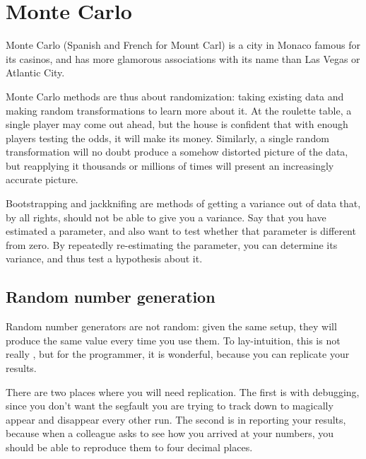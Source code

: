 \startonecol \chapter{Monte Carlo} \label{boot} \endonecol

Monte Carlo (Spanish and French for Mount Carl) is a city in Monaco
famous for its casinos, and has more glamorous associations with its name
than Las Vegas or Atlantic City.

Monte Carlo methods are thus about randomization: taking existing data
and making random transformations to learn more about it. At the
roulette table, a single player may come out ahead, but the house is
confident that with enough players testing the odds, it will make its
money.  Similarly, a single random transformation will no doubt produce a
somehow distorted picture of the data, but reapplying it thousands or
millions of times will present an increasingly accurate picture.

Bootstrapping and jackknifing are methods of getting a variance out of
data that, by all rights, should not be able to give you a variance. Say
that you have estimated a parameter, and also want to test whether
that parameter is different from zero. By repeatedly re-estimating the
parameter, you can determine its variance, and thus test a hypothesis
about it.

\section{Random number generation}\label{randomnumbers}
Random number generators are not random: given the same setup, they
will produce the same value every time you use them. To lay-intuition,
this is not really , but for the programmer, it is wonderful,
because you can replicate your results.

There are two places where you will need replication. The first is with
debugging, since you don't want the segfault you are trying to track
down to magically appear and disappear every other run. The second is
in reporting your results, because when a colleague asks to see how you
arrived at your numbers, you should be able to reproduce them to four
decimal places.

